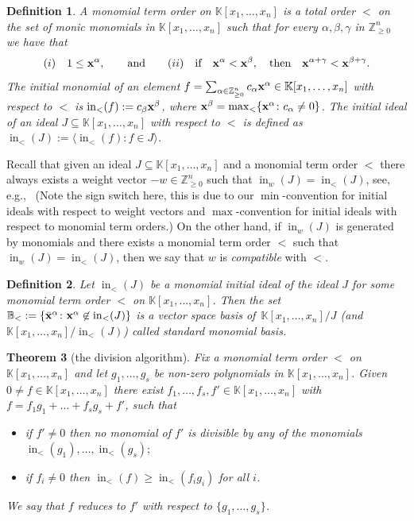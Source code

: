 \documentclass[pdftex]{sigma}%
\newtheorem{Theorem}{Theorem}[section]
\newtheorem{Definition}[Theorem]{Definition}
\numberwithin{equation}{section}
\DeclareMathOperator{\init}{in}
\begin{document}
\begin{Definition}
A {\it monomial term order} on $\mathbb K[x_1, \dots , x_n]$ is a total order $<$ on the set of monic monomials in $\mathbb K[x_1, \dots , x_n]$ such that for every $\alpha,\beta,\gamma$ in $\mathbb Z_{\ge 0}^n$ we have that
\[
(i)\quad 1\le {\bf x}^\alpha,\qquad \text{and}\qquad
(ii)\quad \text{if}\quad {\bf x}^\alpha<{\bf x}^\beta, \quad \text{then}\quad {\bf x}^{\alpha+\gamma}<{\bf x}^{\beta+\gamma}.
\]
The {\it initial monomial} of an element $f=\sum_{\alpha\in \mathbb{Z}^n_{\geq 0}} c_{\alpha} {\bf x}^{\alpha}\in \mathbb K[x_1, \dots , x_n]$ with respect to $<$ is $\init_<(f):=c_\beta{\bf x}^{\beta}$, where ${\bf x}^\beta=\max_<\{{\bf x}^\alpha\colon c_\alpha\not=0\}$.
The {\it initial ideal} of an ideal $J\subseteq \mathbb K[x_1, \dots , x_n]$ with respect to $<$ is defined as $\init_<(J):=\langle \init_<(f)\colon f\in J\rangle$.
\end{Definition}

Recall that given an ideal $J\subseteq \mathbb K[x_1, \dots , x_n]$ and a monomial term order $<$ there always exists a weight vector $-w\in \mathbb{Z}_{\geq 0}^n$
such that $\init_w(J)=\init_<(J)$, see, e.g.,~\cite[Theorem~3.1.2]{herzog2011monomial} (Note the sign switch here, this is due to our $\min$-convention for initial ideals with respect to weight vectors and $\max$-convention for initial ideals with respect to monomial term orders.)
On the other hand, if $\init_w(J)$ is generated by monomials and there exists a monomial term order $<$ such that $\init_w(J)=\init_{<}(J)$, then
we say that $w$ is {\it compatible} with $<$.


\begin{Definition}
Let $\init_<(J)$ be a monomial initial ideal of the ideal $J$ for some monomial term order $<$ on $\mathbb{K}[x_1,\ldots,x_n]$. %
Then the set $\mathbb B_{<}:=\{\bar{\bf x}^\alpha \colon {\bf x}^\alpha\not \in \init_<(J)\}$ is a vector space basis of~$\mathbb K[x_1, \dots , x_n]/J$ (and $\mathbb K[x_1, \dots , x_n]/\init_<(J)$) called {\it standard monomial basis}.
\end{Definition}


{\samepage\begin{Theorem}[{the division algorithm}]
Fix a monomial term order $<$ on $\mathbb K[x_1,\dots,x_n]$ and let $g_1,\dots,g_s$ be non-zero polynomials in $\mathbb K[x_1,\dots,x_n]$. Given $0\not=f\in\mathbb K[x_1,\dots,x_n]$ there exist $f_1,\dots,f_s,f'\in \mathbb K[x_1,\dots,x_n]$ with $f= f_1g_1+\dots+f_sg_s+f'$, such that
\begin{itemize}\itemsep=0pt
\item[$(i)$] if $f'\neq0$ then no monomial of $f'$ is divisible by any of the monomials $\init_<(g_1),\dots,\init_<(g_s);$
\item[$(ii)$] if $f_i\not=0$ then $\init_<(f)\ge\init_<(f_ig_i)$ for all $i$.
\end{itemize}
We say that $f$ reduces to $f'$ with respect to $\{g_1,\dots,g_s\}$.
\end{Theorem}

}
\end{document}
